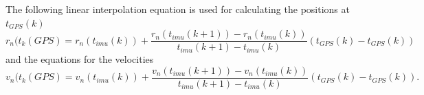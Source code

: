 The following linear interpolation equation is used for calculating the positions at $t_{GPS}(k)$
\begin{equation}
r_n(t_k(GPS) = r_n(t_{imu}(k)) + \frac{r_n(t_{imu}(k+1))-r_n(t_{imu}(k))}{t_{imu}(k+1)-t_{imu}(k)}(t_{GPS}(k)-t_{GPS}(k))
\end{equation}
 and the equations for the velocities 
 \begin{equation}
v_n(t_k(GPS) = v_n(t_{imu}(k)) + \frac{v_n(t_{imu}(k+1))-v_n(t_{imu}(k))}{t_{imu}(k+1)-t_{imu}(k)}(t_{GPS}(k)-t_{GPS}(k)).
\end{equation}


























